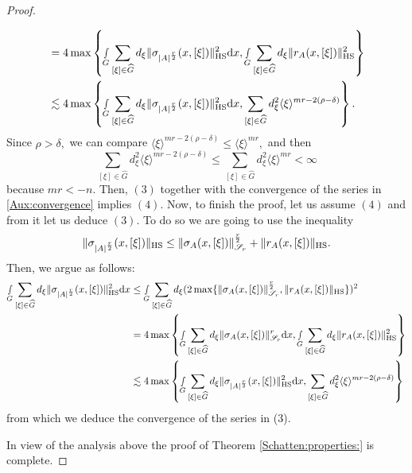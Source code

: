 \documentclass[12pt, reqno]{amsart}
\theoremstyle{definition}
\theoremstyle{remark}
\numberwithin{equation}{section}
\begin{document}
\begin{proof}
\begin{itemize}
\begin{align*}
     &= 4\max\left\{\smallint\limits_G\sum_{[\xi]\in \widehat{G}}d_\xi  \Vert\sigma_{|A|^{\frac{r}{2}}}(x,[\xi])\Vert_{\textnormal{HS}}^2\textnormal{d}x,\smallint\limits_G\sum_{[\xi]\in \widehat{G}}d_\xi \Vert r_{A}(x,[\xi])\Vert_{\textnormal{HS}}^2\right\}\\
      &\lesssim  4\max\left\{\smallint\limits_G\sum_{[\xi]\in \widehat{G}}d_\xi  \Vert\sigma_{|A|^{\frac{r}{2}}}(x,[\xi])\Vert_{\textnormal{HS}}^2\textnormal{d}x,\sum_{[\xi]\in \widehat{G}}d_\xi^2 \langle \xi\rangle^{mr-2(\rho-\delta)}\right\}.
   \end{align*}Since $\rho>\delta,$ we can compare $\langle \xi\rangle^{mr-2(\rho-\delta)}\leq \langle \xi\rangle^{mr},$ and then
   \begin{equation}\label{Aux:convergence}
       \sum_{[\xi]\in \widehat{G}}d_\xi^2 \langle \xi\rangle^{mr-2(\rho-\delta)}\leq \sum_{[\xi]\in \widehat{G}}d_\xi^2 \langle \xi\rangle^{mr}<\infty
   \end{equation}because $mr<-n.$ Then, $(3)$ together with the convergence of the series in \eqref{Aux:convergence} implies $(4)$. Now, to finish the proof, let us assume $(4)$ and from it let us deduce $(3).$ To do so we are going to use the inequality
   \begin{equation}
     \Vert\sigma_{|A|^{\frac{r}{2}}}(x,[\xi])\Vert_{\textnormal{HS}}    \leq \Vert  \sigma_A(x,[\xi]) \Vert_{\mathscr{S}_r}^{\frac{r}{2}}+ \Vert r_{A}(x,[\xi])\Vert_{\textnormal{HS}}.
   \end{equation} Then, we argue as follows:
   \begin{align*}
      \smallint\limits_G\sum_{[\xi]\in \widehat{G}}d_\xi \Vert\sigma_{|A|^{\frac{r}{2}}}(x,[\xi])\Vert_{\textnormal{HS}}^2 \textnormal{d}x &\leq  \smallint\limits_G\sum_{[\xi]\in \widehat{G}}d_\xi (2\max\{ \Vert  \sigma_A(x,[\xi]) \Vert_{\mathscr{S}_r}^{\frac{r}{2}}, \Vert r_{A}(x,[\xi])\Vert_{\textnormal{HS}}\})^2\\
     &= 4\max\left\{\smallint\limits_G\sum_{[\xi]\in \widehat{G}}d_\xi  \Vert  \sigma_A(x,[\xi]) \Vert_{\mathscr{S}_r}^{r}\textnormal{d}x,\smallint\limits_G\sum_{[\xi]\in \widehat{G}}d_\xi \Vert r_{A}(x,[\xi])\Vert_{\textnormal{HS}}^2\right\}\\
      &\lesssim  4\max\left\{\smallint\limits_G\sum_{[\xi]\in \widehat{G}}d_\xi  \Vert\sigma_{|A|^{\frac{r}{2}}}(x,[\xi])\Vert_{\textnormal{HS}}^2\textnormal{d}x,\sum_{[\xi]\in \widehat{G}}d_\xi^2 \langle \xi\rangle^{mr-2(\rho-\delta)}\right\}
   \end{align*}from which we deduce the convergence of the series in (3).
     \end{itemize} In view of the analysis above the proof of Theorem \ref{Schatten:properties:} is complete.
\end{proof}
\end{document}
